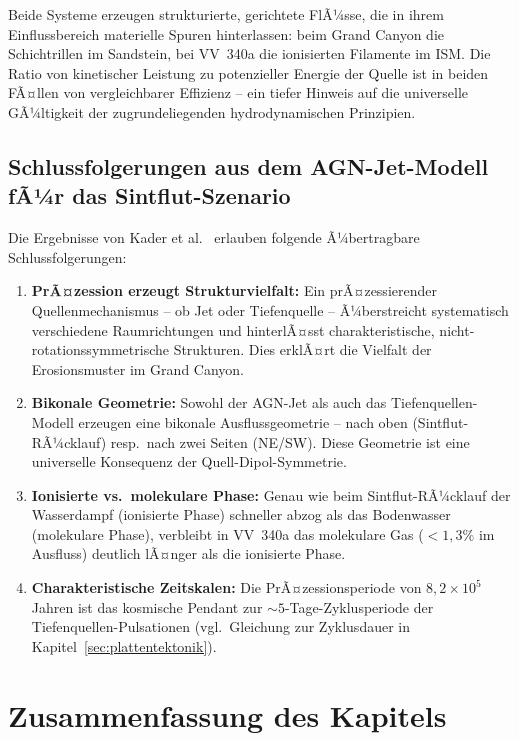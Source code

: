 ﻿\documentclass[12pt,a4paper]{report}
\begin{document}
Beide Systeme erzeugen strukturierte, gerichtete FlÃ¼sse, die in ihrem Einflussbereich materielle Spuren hinterlassen: beim Grand Canyon die Schichtrillen im Sandstein, bei VV~340a die ionisierten Filamente im ISM. Die Ratio von kinetischer Leistung zu potenzieller Energie der Quelle ist in beiden FÃ¤llen von vergleichbarer Effizienz -- ein tiefer Hinweis auf die universelle GÃ¼ltigkeit der zugrundeliegenden hydrodynamischen Prinzipien.

\subsection{Schlussfolgerungen aus dem AGN-Jet-Modell fÃ¼r das Sintflut-Szenario}

Die Ergebnisse von Kader et al.\ \cite{kader2026} erlauben folgende Ã¼bertragbare Schlussfolgerungen:

\begin{enumerate}
	\item \textbf{PrÃ¤zession erzeugt Strukturvielfalt:} Ein prÃ¤zessierender Quellenmechanismus -- ob Jet oder Tiefenquelle -- Ã¼berstreicht systematisch verschiedene Raumrichtungen und hinterlÃ¤sst charakteristische, nicht-rotationssymmetrische Strukturen. Dies erklÃ¤rt die Vielfalt der Erosionsmuster im Grand Canyon.
	
	\item \textbf{Bikonale Geometrie:} Sowohl der AGN-Jet als auch das Tiefenquellen-Modell erzeugen eine bikonale Ausflussgeometrie -- nach oben (Sintflut-RÃ¼cklauf) resp.\ nach zwei Seiten (NE/SW). Diese Geometrie ist eine universelle Konsequenz der Quell-Dipol-Symmetrie.
	
	\item \textbf{Ionisierte vs.\ molekulare Phase:} Genau wie beim Sintflut-RÃ¼cklauf der Wasserdampf (ionisierte Phase) schneller abzog als das Bodenwasser (molekulare Phase), verbleibt in VV~340a das molekulare Gas ($<1{,}3\%$ im Ausfluss) deutlich lÃ¤nger als die ionisierte Phase.
	
	\item \textbf{Charakteristische Zeitskalen:} Die PrÃ¤zessionsperiode von $8{,}2 \times 10^5$\,Jahren ist das kosmische Pendant zur $\sim 5$-Tage-Zyklusperiode der Tiefenquellen-Pulsationen (vgl.\ Gleichung zur Zyklusdauer in Kapitel~\ref{sec:plattentektonik}).
\end{enumerate}

\section{Zusammenfassung des Kapitels}
\end{document}
